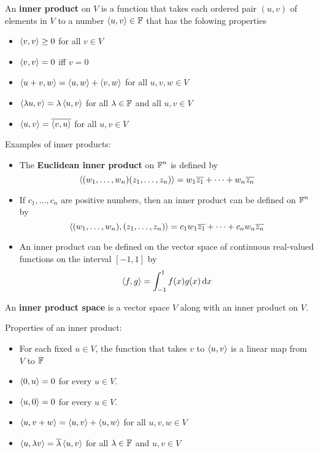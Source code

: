 \begin{definition} 
    An \textbf{inner product} on $V$ is a function that takes each ordered pair
    $(u, v)$ of elements in $V$ to a number $\left\langle u, v \right\rangle \in \operatorname{\mathbb{F}}$ that has the folowing properties
    \begin{itemize}
        \item $\left\langle v, v \right\rangle \geq 0$ for all $v \in V$
        \item $\left\langle v, v \right\rangle = 0$ iff $v = 0$
        \item $\left\langle u + v, w \right\rangle = \left\langle u, w \right\rangle + \left\langle v, w \right\rangle$ for all $u, v, w \in V$
        \item $\left\langle \lambda u, v \right\rangle = \lambda \left\langle u, v \right\rangle$ for all $\lambda \in \operatorname{\mathbb{F}}$ and all $u, v \in V$
        \item $\left\langle u, v \right\rangle = \overline{\left\langle v, u \right\rangle}$ for all $u, v \in V$
    \end{itemize}
\end{definition}

\begin{example} Examples of inner products:
    \begin{itemize}
        \item The \textbf{Euclidean inner product} on $\operatorname{\mathbb{F}}^n$ is defined by
        \[ \left\langle (w_1, \dots, w_n)(z_1, \dots, z_n) \right\rangle = w_1 \overline{z_1} + \dots + w_n \overline{z_n} \]
        \item If $c_1, \dots, c_n$ are positive numbers, then an inner product can be defined on $\operatorname{\mathbb{F}}^n$ by
        \[ \left\langle (w_1, \dots, w_n), (z_1, \dots, z_n) \right\rangle = c_1 w_1 \overline{z_1} + \dots + c_n w_n \overline{z_n} \]
        \item An inner product can be defined on the vector space of continuous real-valued functions on the interval $[-1, 1]$ by
        \[ \left\langle f, g \right\rangle = \int_{-1}^1 f(x) g(x) \dd{x} \]
    \end{itemize}
\end{example}

\begin{definition} 
    An \textbf{inner product space} is a vector space $V$ along with an inner product on $V$.
\end{definition}

\begin{theorem}
    Properties of an inner product:
    \begin{itemize}
        \item For each fixed $u \in V$, the function that takes $v$ to $\left\langle u, v \right\rangle$ is a linear map from $V$ to $\operatorname{\mathbb{F}}$
        \item $\left\langle 0, u \right\rangle = 0$ for every $u \in V$.
        \item $\left\langle u, 0 \right\rangle = 0$ for every $u \in V$.
        \item $\left\langle u, v + w \right\rangle = \left\langle u, v \right\rangle + \left\langle u, w \right\rangle$ for all $u, v, w \in V$
        \item $\left\langle u, \lambda v \right\rangle = \overline{\lambda} \left\langle u, v \right\rangle$ for all $\lambda \in \operatorname{\mathbb{F}}$ and $u, v \in V$
    \end{itemize}
\end{theorem}


